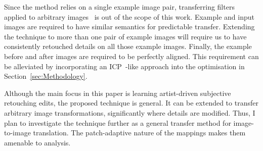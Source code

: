 Since the method relies on a single example image pair, transferring filters applied to arbitrary images~\cite{Yan14Automatic} is out of the scope of this work. Example and input images are required to have similar semantics for predictable transfer. Extending the technique to more than one pair of example images will require us to have consistently retouched details on all those example images. Finally, the example before and after images are required to be perfectly aligned. This requirement can be alleviated by incorporating an ICP~\cite{Besl92AMethod}-like approach into the optimisation in Section~\ref{sec:Methodology}. 

Although the main focus in this paper is learning artist-driven subjective retouching edits, the proposed technique is general. It can be extended to transfer arbitrary image transformations, significantly where details are modified. Thus, I plan to investigate the technique further as a general transfer method for image-to-image translation. The patch-adaptive nature of the mappings makes them amenable to analysis.
